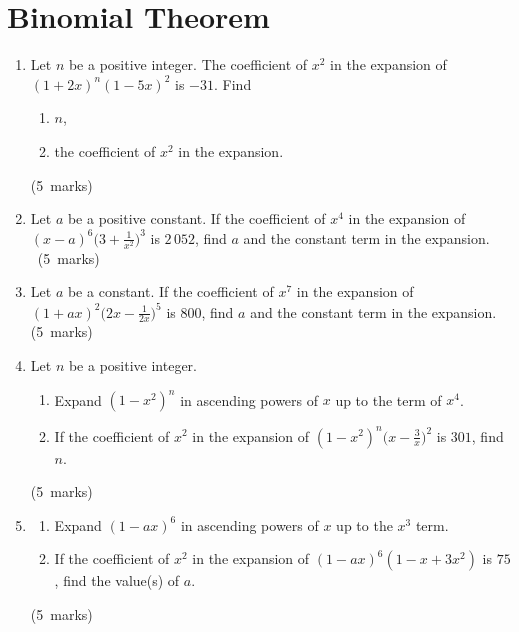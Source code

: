 \documentclass[12pt, a4paper]{article} %
\newcommand{\qmarks}[1]{\leavevmode\unskip\hspace*{\fill}\mbox{(#1 marks)}}
\begin{document}
\newpage

\section{Binomial Theorem}
\begin{enumerate}
    \item Let \(n\) be a positive integer. The coefficient of \(x^2\) in the expansion of \((1+2x)^n(1-5x)^2\) is 
    \(-31\). Find
    \begin{enumerate}
        \item \(n\),
        \item the coefficient of \(x^2\) in the expansion.
    \end{enumerate} \qmarks{5}
    \item Let \(a\) be a positive constant. If the coefficient  of \(x^4\) in the expansion of\\
    \(\displaystyle (x-a)^6\bigg(3+\frac{1}{x^2}\bigg)^3\) is \(2\,052\), find \(a\) and the constant term in the expansion.\\
    \, \qmarks{5}
    
    \item Let \(a\) be a constant. If the coefficient of \(x^7\) in the expansion of \\
    \(\displaystyle (1+ax)^2\bigg(2x-\frac{1}{2x}\bigg)^5\) is \(800\), find \(a\) and the constant term in the expansion. \qmarks{5}

    \item Let \(n\) be a positive integer.
        \begin{enumerate}
            \item Expand \((1-x^2)^n\) in ascending powers of \(x\) up to the term of \(x^4\).
            \item If the coefficient of \(x^2\) in the expansion of \(\displaystyle (1-x^2)^n\bigg(x-\frac{3}{x}\bigg)^2\) is \(301\), find \(n\).
        \end{enumerate}\qmarks{5}


    \item \begin{enumerate}
        \item Expand \((1-ax)^6\) in ascending powers of \(x\) up to the \(x^3\) term.
        \item If the coefficient of \(x^2\) in the expansion of \((1-ax)^6(1-x+3x^2)\) is \(75\), find the value(s) of \(a\).
    \end{enumerate}\qmarks{5}
\end{enumerate}
\newpage
\end{document}
